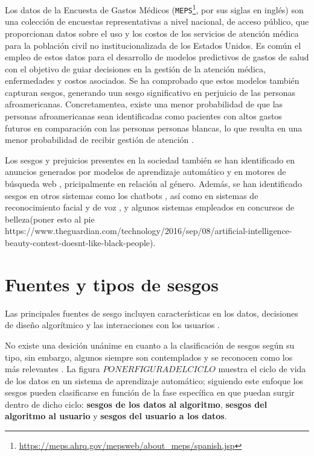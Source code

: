     Los datos de la Encuesta de Gastos M\'edicos (\texttt{MEPS}\footnote{\url{https://meps.ahrq.gov/mepsweb/about_meps/spanish.jsp}}, 
    por sus siglas en ingl\'es) son una colecci\'on de encuestas representativas a nivel nacional, de acceso p\'ublico, que proporcionan 
    datos sobre el uso y los costos de los servicios de atenci\'on m\'edica para la poblaci\'on civil no institucionalizada de los Estados Unidos. 
    Es com\'un el empleo de estos datos para el desarrollo de modelos predictivos de gastos de salud con el objetivo de guiar decisiones 
    en la gesti\'on de la atenci\'on m\'edica, enfermedades y costos asociados. Se ha comprobado que estos modelos tambi\'en capturan sesgos, 
    generando uun sesgo significativo en perjuicio de las personas afroamericanas. Concretamentea, existe una menor probabilidad de que 
    las personas afroamericanas sean identificadas como pacientes con altos gastos futuros en comparaci\'on con las personas personas blancas, 
    lo que resulta en una menor probabilidad de recibir gesti\'on de atenci\'on \cite{understanding}.

    Los sesgos y prejuicios presentes en la sociedad tambi\'en se han identificado en anuncios generados por modelos de aprendizaje autom\'atico
    \cite{sweeney2013discrimination,datta2015automated} y en motores de b\'usqueda web \cite{unequal_rep}, pricipalmente en relaci\'on al 
    g\'enero. Adem\'as, se han identificado sesgos en otros sistemas como los chatbots \cite{chatbot_bias}, as\'i como en sistemas de 
    reconocimiento facial \cite{facial_bias} y de voz \cite{voice_bias}, y algunos sistemas empleados en concursos de belleza(poner esto al pie
    https://www.theguardian.com/technology/2016/sep/08/artificial-intelligence-beauty-contest-doesnt-like-black-people).

\section{Fuentes y tipos de sesgos}

    Las principales fuentes de sesgo incluyen caracter\'isticas en los datos, decisiones de dise\~no algor\'itmico y las interacciones 
    con los usuarios \cite{resp_data}.
    
    No existe una desici\'on un\'anime en cuanto a la clasificaci\'on de sesgos seg\'un su tipo, sin embargo, 
    algunos siempre son contemplados y se reconocen como los m\'as relevantes \cite{survey}. La figura $PONER FIGURA DEL CICLO$ muestra 
    el ciclo de vida de los datos en un sistema de aprendizaje autom\'atico; siguiendo este enfoque los sesgos pueden clasificarse 
    en funci\'on de la fase espec\'ifica en que puedan surgir dentro de dicho ciclo: \textbf{sesgos de los datos al algoritmo}, 
    \textbf{sesgos del algoritmo al usuario} y \textbf{sesgos del usuario a los datos}.
    
